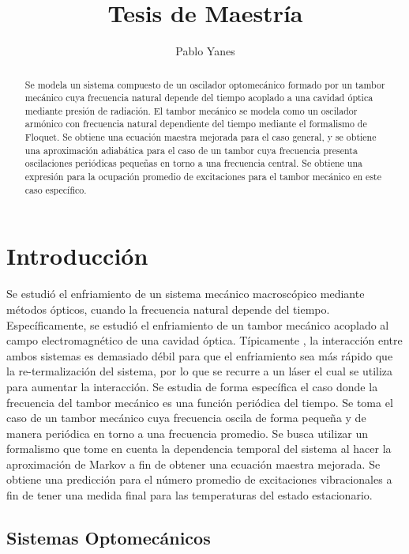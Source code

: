 \documentclass[a4paper,10pt]{report}
\title{Tesis de Maestría}
\author{Pablo Yanes}
\begin{document}
\begin{abstract}
Se modela un sistema compuesto de un oscilador optomecánico formado por un tambor mecánico cuya frecuencia natural depende del tiempo acoplado a una cavidad óptica mediante presión de radiación. El tambor mecánico se modela como un oscilador armónico con frecuencia natural dependiente del tiempo mediante el formalismo de Floquet. Se obtiene una ecuación maestra mejorada para el caso general, y se obtiene una aproximación adiabática para el caso de un tambor cuya frecuencia presenta oscilaciones periódicas pequeñas en torno a una frecuencia central. Se obtiene una expresión para la ocupación promedio de excitaciones para el tambor mecánico en este caso específico.
\end{abstract}

\tableofcontents

\chapter{Introducción}

Se estudió el enfriamiento de un sistema mecánico macroscópico mediante métodos ópticos, cuando la frecuencia natural depende del tiempo. Específicamente, se estudió el enfriamiento de un tambor mecánico acoplado al campo electromagnético de una cavidad óptica. Típicamente \cite{BarberisLC}, la interacción entre ambos sistemas es demasiado débil para que el enfriamiento sea más rápido que la re-termalización del sistema, por lo que se recurre a un láser el cual se utiliza para aumentar la interacción. Se estudia de forma específica el caso donde la frecuencia del tambor mecánico es una función periódica del tiempo. Se toma el caso de un tambor mecánico cuya frecuencia oscila de forma pequeña y de manera periódica en torno a una frecuencia promedio. Se busca utilizar un formalismo que tome en cuenta la dependencia temporal del sistema al hacer la aproximación de Markov a fin de obtener una ecuación maestra mejorada. Se obtiene una predicción para el número promedio de excitaciones vibracionales a fin de tener una medida final para las temperaturas del estado estacionario.

\section{Sistemas Optomecánicos}
\end{document}
